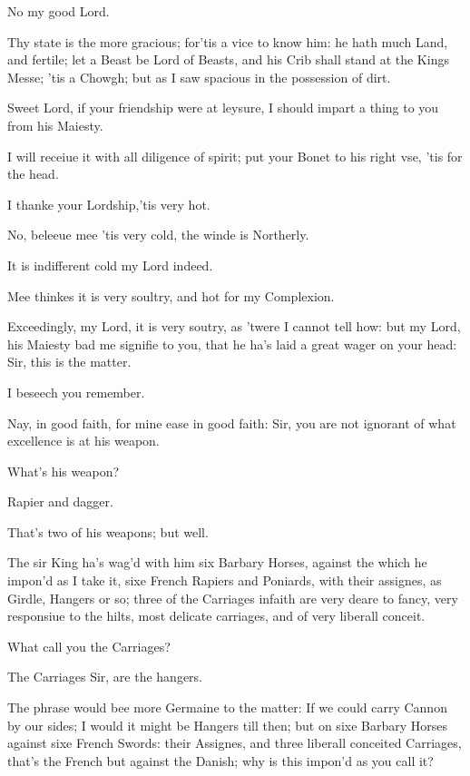 \documentclass[a5paper,DIV=calc,11pt]{scrbook}
\begin{document}
\begin{drama*}
    \horspeaks No my good Lord.
    
    \hamspeaks Thy state is the more gracious; for'tis a vice to know him: he hath much Land, and fertile; let a Beast be Lord of Beasts, and his Crib shall stand at the Kings Messe; 'tis a Chowgh; but as I saw spacious in the possession of dirt.
    
    \osrspeaks Sweet Lord, if your friendship were at leysure, I should impart a thing to you from his Maiesty.
    
    \hamspeaks I will receiue it with all diligence of spirit; put your Bonet to his right vse, 'tis for the head.
    
    \osrspeaks I thanke your Lordship,'tis very hot.
    
    \hamspeaks No, beleeue mee 'tis very cold, the winde is Northerly.
    
    \osrspeaks It is indifferent cold my Lord indeed.
    
    \hamspeaks Mee thinkes it is very soultry, and hot for my Complexion.
    
    \osrspeaks Exceedingly, my Lord, it is very soutry, as 'twere I cannot tell how: but my Lord, his Maiesty bad me signifie to you, that he ha's laid a great wager on your head:\\
    Sir, this is the matter.
    
    \hamspeaks I beseech you remember.
    
    \osrspeaks Nay, in good faith, for mine ease in good faith: Sir, you are not ignorant of what excellence \laer is at his weapon.
    
    \hamspeaks What's his weapon?
    
    \osrspeaks Rapier and dagger.
    
    \hamspeaks That's two of his weapons; but well.
    
    \osrspeaks The sir King ha's wag'd with him six Barbary Horses, against the which he impon'd as I take it, sixe French Rapiers and Poniards, with their assignes, as Girdle, Hangers or so; three of the Carriages infaith are very deare to fancy, very responsiue to the hilts, most delicate carriages, and of very liberall conceit.
    
    \hamspeaks What call you the Carriages?
    
    \osrspeaks The Carriages Sir, are the hangers.
    
    \hamspeaks The phrase would bee more Germaine to the matter: If we could carry Cannon by our sides; I would it might be Hangers till then; but on sixe Barbary Horses against sixe French Swords: their Assignes, and three liberall conceited Carriages, that's the French but against the Danish; why is this impon'd as you call it?
    

\end{drama*}
\end{document}
